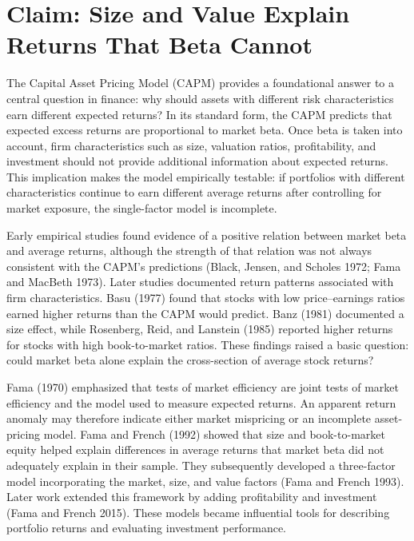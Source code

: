 
\chapter{Claim: Size and Value Explain Returns That Beta Cannot}
\label{ch:03}

The Capital Asset Pricing Model (CAPM) provides a foundational answer to a central question in finance: why should assets with different risk characteristics earn different expected returns? In its standard form, the CAPM predicts that expected excess returns are proportional to market beta. Once beta is taken into account, firm characteristics such as size, valuation ratios, profitability, and investment should not provide additional information about expected returns. This implication makes the model empirically testable: if portfolios with different characteristics continue to earn different average returns after controlling for market exposure, the single-factor model is incomplete.

Early empirical studies found evidence of a positive relation between market beta and average returns, although the strength of that relation was not always consistent with the CAPM's predictions (Black, Jensen, and Scholes 1972; Fama and MacBeth 1973). Later studies documented return patterns associated with firm characteristics. Basu (1977) found that stocks with low price--earnings ratios earned higher returns than the CAPM would predict. Banz (1981) documented a size effect, while Rosenberg, Reid, and Lanstein (1985) reported higher returns for stocks with high book-to-market ratios. These findings raised a basic question: could market beta alone explain the cross-section of average stock returns?

Fama (1970) emphasized that tests of market efficiency are joint tests of market efficiency and the model used to measure expected returns. An apparent return anomaly may therefore indicate either market mispricing or an incomplete asset-pricing model. Fama and French (1992) showed that size and book-to-market equity helped explain differences in average returns that market beta did not adequately explain in their sample. They subsequently developed a three-factor model incorporating the market, size, and value factors (Fama and French 1993). Later work extended this framework by adding profitability and investment (Fama and French 2015). These models became influential tools for describing portfolio returns and evaluating investment performance.


